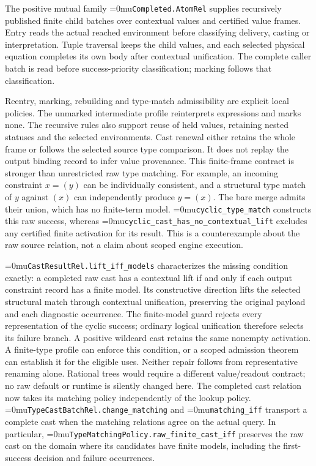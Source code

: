 \documentclass[11pt,a4paper]{article}
\newcommand{\name}[1]{\textup{\Urlmuskip=0mu\relax\nolinkurl{#1}}}
\begin{document}
The positive mutual family \name{Completed.AtomRel} supplies recursively
published finite child batches over contextual values and certified value
frames. Entry reads the actual reached environment before classifying delivery,
casting or interpretation. Tuple traversal keeps the child values, and each
selected physical equation completes its own body after contextual unification.
The complete caller batch is read before success-priority classification;
marking follows that classification.

Reentry, marking, rebuilding and type-match admissibility are explicit local policies. The unmarked
intermediate profile reinterprets expressions and marks none. The recursive
rules also support reuse of held values, retaining nested statuses and the
selected environments. Cast renewal either retains the whole frame or follows
the selected source type comparison. It does not replay the output binding
record to infer value provenance.
This finite-frame contract is stronger than unrestricted raw type matching.
For example, an incoming constraint $x=(y)$ can be individually consistent,
and a structural type match of $y$ against $(x)$ can independently produce
$y=(x)$. The bare merge admits their union, which has no finite-term model.
\name{cyclic_type_match} constructs this raw success, whereas
\name{cyclic_cast_has_no_contextual_lift} excludes any certified finite
activation for its result. This is a counterexample about the raw source
relation, not a claim about scoped engine execution.

\name{CastResultRel.lift_iff_models} characterizes the missing condition
exactly: a completed raw cast has a contextual lift if and only if each output
constraint record has a finite model. Its constructive direction lifts the
selected structural match through contextual unification, preserving the
original payload and each diagnostic occurrence. The finite-model guard
rejects every representation of the cyclic success; ordinary logical
unification therefore selects its failure branch. A positive wildcard cast
retains the same nonempty activation. A finite-type profile can enforce this
condition, or a scoped admission theorem can establish it for the eligible
uses. Neither repair follows from representative renaming alone. Rational
trees would require a different value/readout contract; no raw default or
runtime is silently changed here.
The completed cast relation now takes its matching policy independently of
the lookup policy. \name{TypeCastBatchRel.change_matching} and
\name{matching_iff} transport a complete cast when the matching relations
agree on the actual query. In particular,
\name{TypeMatchingPolicy.raw_finite_cast_iff} preserves the raw cast on the
domain where its candidates have finite models, including the first-success
decision and failure occurrences.
\end{document}
